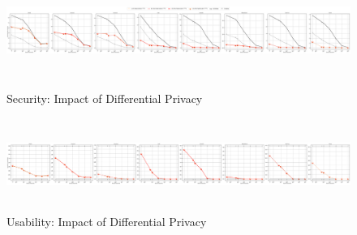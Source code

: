 \begin{figure}
	\includegraphics[width=\linewidth, height = 3cm]{Figures/Experiments/Attacker/SecurityDPCompare}
	\vspace{-0.2in}
	\caption[Security: Impact of Differential Privacy]{Security: Impact of Differential Privacy}
	\label{fig:securitydpcompare}	
	\includegraphics[width=\linewidth, height = 3cm]{Figures/Experiments/Utility/UsabilityDPCompare}
	\vspace{-0.2in}
	\caption[Usability: Impact of Differential Privacy]{Usability: Impact of Differential Privacy}
	\label{fig:usabilitydpcompare}
	
	
	
	
\end{figure}








